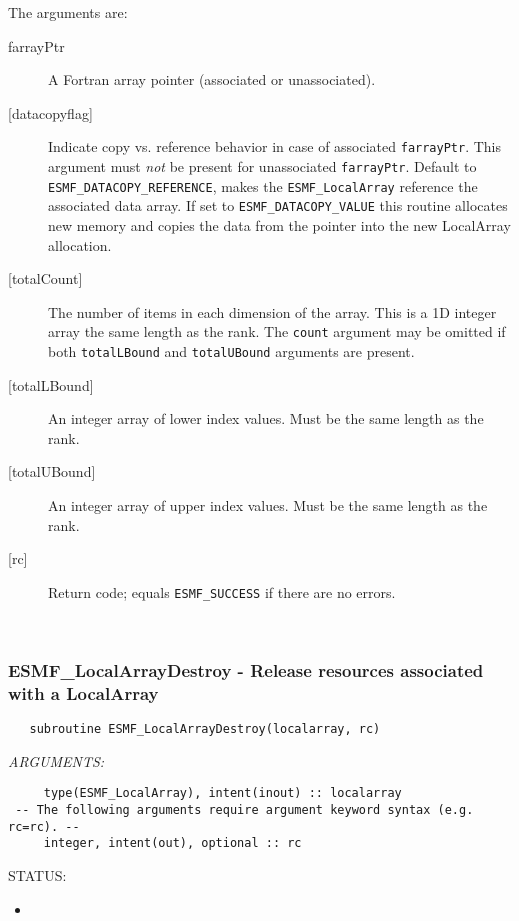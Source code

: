   The arguments are: 
   \begin{description} 
   \item[farrayPtr] 
   A Fortran array pointer (associated or unassociated). 
   \item[{[datacopyflag]}] 
   Indicate copy vs. reference behavior in case of associated {\tt farrayPtr}. 
   This argument must {\em not} be present for unassociated {\tt farrayPtr}. 
   Default to {\tt ESMF\_DATACOPY\_REFERENCE}, makes the {\tt ESMF\_LocalArray} 
   reference the associated data array. If set to {\tt ESMF\_DATACOPY\_VALUE} this 
   routine allocates new memory and copies the data from the pointer into 
   the new LocalArray allocation. 
   \item[{[totalCount]}] 
   The number of items in each dimension of the array. This is a 1D 
   integer array the same length as the rank. The {\tt count} argument may 
   be omitted if both {\tt totalLBound} and {\tt totalUBound} arguments are present. 
   \item[{[totalLBound]}] 
   An integer array of lower index values. Must be the same length as the rank. 
   \item[{[totalUBound]}] 
   An integer array of upper index values. Must be the same length as the rank. 
   \item[{[rc]}] 
   Return code; equals {\tt ESMF\_SUCCESS} if there are no errors. 
   \end{description} 
    
 
\mbox{}\hrulefill\ 
 
\subsubsection [ESMF\_LocalArrayDestroy] {ESMF\_LocalArrayDestroy - Release resources associated with a LocalArray}


  
\begin{verbatim}   subroutine ESMF_LocalArrayDestroy(localarray, rc)\end{verbatim}{\em ARGUMENTS:}
\begin{verbatim}     type(ESMF_LocalArray), intent(inout) :: localarray
 -- The following arguments require argument keyword syntax (e.g. rc=rc). --
     integer, intent(out), optional :: rc\end{verbatim}
{\sf STATUS:}
   \begin{itemize}
   \item{}
   \end{itemize}
  
